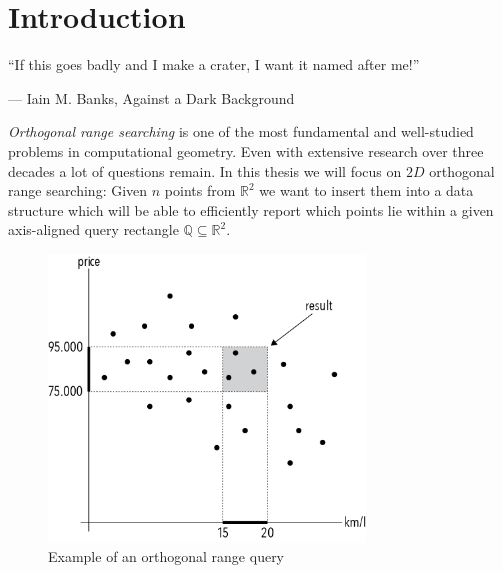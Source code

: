 \chapter{Introduction}
\label{ch:intro}
\epigraph{``If this goes badly and I make a crater, I want it named after me!''}{ --- \textup{Iain M. Banks}, Against a Dark Background}


\noindent \emph{Orthogonal range searching} is one of the most fundamental and well-studied problems in computational geometry. Even with extensive research over three decades a lot of questions remain. In this thesis we will focus on $2D$ orthogonal range searching: Given $n$ points from $\mathbb{R}^2$ we want to insert them into a data structure which will be able to efficiently report which points lie within a given axis-aligned query rectangle $\mathbb{Q} \subseteq \mathbb{R}^2$.

\begin{figure}[h]
    \centering
    \includegraphics[width = 0.75\textwidth]{pictures/introduction.png}
    \caption{Example of an orthogonal range query}\label{fig:example}
\end{figure}

